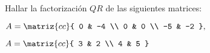 \begin{enunciado}{\ejercicio}
  Hallar la factorización $QR$ de las siguientes matrices:
  \begin{center}
    \parbox{0.6\textwidth}{
      \begin{enumerate}[label=\alph*)]
        \begin{multicols}{2}
          \item $
            A =
            \matriz{cc}{
              0 & -4 \\
              0 & 0 \\
              -5 & -2
            },
          $
          \item $
            A =
            \matriz{cc}{
              3 & 2 \\
              4 & 5
            }
          $
        \end{multicols}
      \end{enumerate}
    }
  \end{center}
\end{enunciado}

